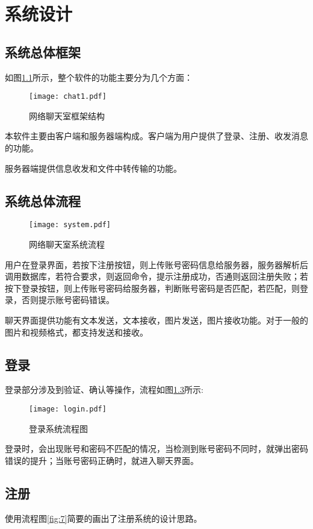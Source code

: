 \documentclass[forprint]{sql}
\begin{document}
\chapter{系统设计}
\section{系统总体框架}
如图\ref{fig:5}所示，整个软件的功能主要分为几个方面：

\begin{figure}[!htbp]
	\centering
	\texttt{[image: chat1.pdf]}
	\caption{网络聊天室框架结构}
	\label{fig:5}
\end{figure}

本软件主要由客户端和服务器端构成。客户端为用户提供了登录、注册、收发消息的功能。

服务器端提供信息收发和文件中转传输的功能。

\section{系统总体流程}

\begin{figure}[!ht]
	\centering
	\texttt{[image: system.pdf]}
	\caption{网络聊天室系统流程}
	\label{fig:14}
\end{figure}

用户在登录界面，若按下注册按钮，则上传账号密码信息给服务器，服务器解析后调用数据库，若符合要求，则返回命令，提示注册成功，否通则返回注册失败；若按下登录按钮，则上传账号密码给服务器，判断账号密码是否匹配，若匹配，则登录，否则提示账号密码错误。

聊天界面提供功能有文本发送，文本接收，图片发送，图片接收功能。对于一般的图片和视频格式，都支持发送和接收。

\section{登录}
登录部分涉及到验证、确认等操作，流程如图\ref{fig:6}所示:

\begin{figure}[!ht]
	\centering
	\texttt{[image: login.pdf]}
	\caption{登录系统流程图}
	\label{fig:6}
\end{figure}

登录时，会出现账号和密码不匹配的情况，当检测到账号密码不同时，就弹出密码错误的提升；当账号密码正确时，就进入聊天界面。

\section{注册}
使用流程图\ref{fig:7}简要的画出了注册系统的设计思路。
\end{document}
